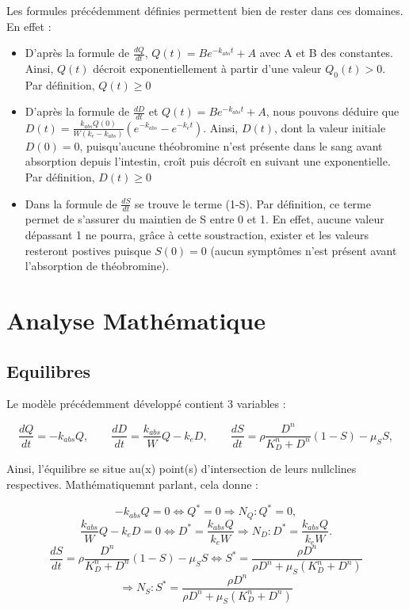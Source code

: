 \documentclass[11pt,a4paper]{article}
\begin{document}
Les formules précédemment définies permettent bien de rester dans ces domaines. En effet :
\begin{itemize}
    \item {D'après la formule de $\frac{dQ}{dt}$, $Q(t)=Be^{-k_{abs}t}+A$ avec A et B des constantes.
    Ainsi, $Q(t)$ décroit exponentiellement à partir d'une valeur $Q_0(t) > 0$. Par définition, 
    $Q(t)\geq 0$}
    \item {D'après la formule de $\frac{dD}{dt}$ et $Q(t)=Be^{-k_{abs}t}+A$, nous pouvons déduire
    que $D(t)=\frac{k_{abs}Q(0)}{W(k_e-k_{abs})}(e^{-k_{abs}}-e^{-k_et})$. Ainsi, $D(t)$, dont
    la valeur initiale $D(0)=0$, puisqu'aucune théobromine n'est présente dans le sang avant 
    absorption depuis l'intestin, croît puis décroît en suivant une exponentielle. Par définition, 
    $D(t)\geq 0$}
    \item {Dans la formule de $\frac{dS}{dt}$ se trouve le terme (1-S). Par définition, ce
    terme permet de s'assurer du maintien de S entre 0 et 1. En effet, aucune valeur dépassant
    1 ne pourra, grâce à cette soustraction, exister et les valeurs resteront postives puisque
    $S(0)=0$ (aucun symptômes n'est présent avant l'absorption de théobromine).}
\end{itemize}

\section{Analyse Mathématique}
\label{sec:analysis}

\subsection{Equilibres}

Le modèle précédemment développé contient 3 variables : 

\[
\frac{dQ}{dt}=-k_{abs}Q,
\qquad
\frac{dD}{dt}=\frac{k_{abs}}{W}Q-k_eD,
\qquad
\frac{dS}{dt}=\rho\frac{D^n}{K_D^n + D^n}(1-S)-\mu_SS,
\]

Ainsi, l'équilibre se situe au(x) point(s) d'intersection de leurs nullclines respectives. 
Mathématiquemnt parlant, cela donne : 

\[
-k_{abs}Q=0\Leftrightarrow Q^*=0 \Rightarrow N_Q : Q^*=0,
\] 
\[
\frac{k_{abs}}{W}Q-k_eD=0\Leftrightarrow D^*=\frac{k_{abs}Q}{k_eW} \Rightarrow N_D : D^*=\frac{k_{abs}Q}{k_eW}.
\]
\[
\frac{dS}{dt}=\rho\frac{D^n}{K_D^n + D^n}(1-S)-\mu_SS\Leftrightarrow S^*=\frac{\rho D^n}{\rho D^n + \mu_S(K_D^n+D^n)}
\]
\[
\Rightarrow N_S : S^*= \frac{\rho D^n}{\rho D^n + \mu_S(K_D^n+D^n)}
\]
\end{document}
